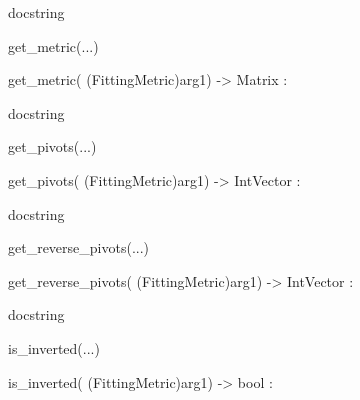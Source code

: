 \documentclass[letterpaper,10pt,english]{sphinxmanual}
\begin{document}
\begin{description}
\begin{description}
\begin{DUlineblock}{0em}
\begin{DUlineblock}{\DUlineblockindent}
\begin{DUlineblock}{\DUlineblockindent}
\item[] docstring
\item[] 
\end{DUlineblock}
\end{DUlineblock}
\item[] get\_metric(...)
\item[]
\begin{DUlineblock}{\DUlineblockindent}
\item[] get\_metric( (FittingMetric)arg1) -\textgreater{} Matrix :
\item[]
\begin{DUlineblock}{\DUlineblockindent}
\item[] docstring
\item[] 
\end{DUlineblock}
\end{DUlineblock}
\item[] get\_pivots(...)
\item[]
\begin{DUlineblock}{\DUlineblockindent}
\item[] get\_pivots( (FittingMetric)arg1) -\textgreater{} IntVector :
\item[]
\begin{DUlineblock}{\DUlineblockindent}
\item[] docstring
\item[] 
\end{DUlineblock}
\end{DUlineblock}
\item[] get\_reverse\_pivots(...)
\item[]
\begin{DUlineblock}{\DUlineblockindent}
\item[] get\_reverse\_pivots( (FittingMetric)arg1) -\textgreater{} IntVector :
\item[]
\begin{DUlineblock}{\DUlineblockindent}
\item[] docstring
\item[] 
\end{DUlineblock}
\end{DUlineblock}
\item[] is\_inverted(...)
\item[]
\begin{DUlineblock}{\DUlineblockindent}
\item[] is\_inverted( (FittingMetric)arg1) -\textgreater{} bool :
\item[]
\begin{DUlineblock}{\DUlineblockindent}

\end{DUlineblock}
\end{DUlineblock}
\end{DUlineblock}
\end{description}
\end{description}
\end{document}
